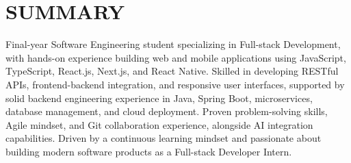 \section{SUMMARY}
\noindent Final-year Software Engineering student specializing in Full-stack Development, with hands-on experience building web and mobile applications using JavaScript, TypeScript, React.js, Next.js, and React Native. Skilled in developing RESTful APIs, frontend-backend integration, and responsive user interfaces, supported by solid backend engineering experience in Java, Spring Boot, microservices, database management, and cloud deployment. Proven problem-solving skills, Agile mindset, and Git collaboration experience, alongside AI integration capabilities. Driven by a continuous learning mindset and passionate about building modern software products as a Full-stack Developer Intern.
